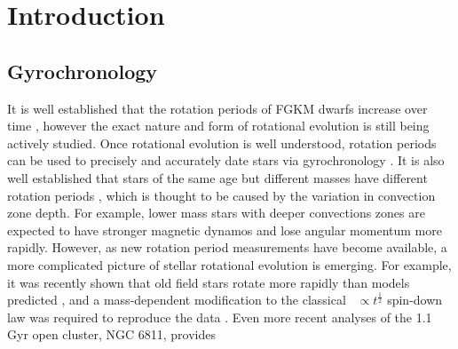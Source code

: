 \section{Introduction}

\subsection{Gyrochronology}
It is well established that the rotation periods of FGKM dwarfs increase over
time \citep{skumanich1972}, however the exact nature and form of rotational
evolution is still being actively studied.
Once rotational evolution is well understood, rotation periods can be used to
precisely and accurately date stars via gyrochronology
\citep[\eg][]{kawaler1989, pinsonneault1989, barnes2003, barnes2007,
barnes2010, meibom2011, meibom2015}.
It is also well established that stars of the same age but different masses
have different rotation periods \citep[\eg][]{kraft1967, matt2012}, which is
thought to be caused by the variation in convection zone depth.
For example, lower mass stars with deeper convections zones are expected to
have stronger magnetic dynamos and lose angular momentum more rapidly.
However, as new rotation period measurements have become available, a more
complicated picture of stellar rotational evolution is emerging.
For example, it was recently shown that old field stars rotate more rapidly
than models predicted \citep{angus2015, vansaders2016, vansaders2018,
metcalfe2019}, and a mass-dependent modification to the classical \prot\
$\propto t^{\frac{1}{2}}$ spin-down law \citep{skumanich1972} was required to
reproduce the data \citep{vansaders2016, vansaders2018}.
Even more recent analyses of the 1.1 Gyr open cluster, NGC 6811, provides
